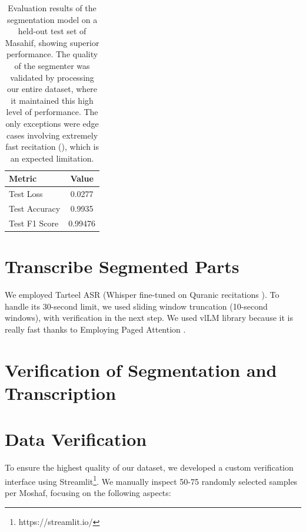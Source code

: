 \begin{longtable}{|l|c|}
\caption{Evaluation results of the segmentation model on a held-out test set of Masahif, showing superior performance. The quality of the segmenter was validated by processing our entire dataset, where it maintained this high level of performance. The only exceptions were edge cases involving extremely fast recitation (), which is an expected limitation.}
\label{tab:vad_results}\\
\hline
\textbf{Metric} & \textbf{Value} \\ 
\hline
\endfirsthead
\hline
Test Loss & 0.0277 \\
\hline
Test Accuracy & 0.9935 \\
\hline
Test F1 Score & 0.99476 \\
\hline
\end{longtable}







\section{Transcribe Segmented Parts}

We employed Tarteel ASR \cite{tarteel_whisper_ar_quran} (Whisper fine-tuned on Quranic recitations \cite{radford2023robust}). To handle its 30-second limit, we used sliding window truncation (10-second windows), with verification in the next step. We used vlLM library because it is really fast thanks to Employing Paged Attention \cite{kwon2023efficient}.










\section{Verification of Segmentation and Transcription}
\section{Data Verification}

To ensure the highest quality of our dataset, we developed a custom verification interface using Streamlit\footnote{https://streamlit.io/}. We manually inspect 50-75 randomly selected samples per Moshaf, focusing on the following aspects:

